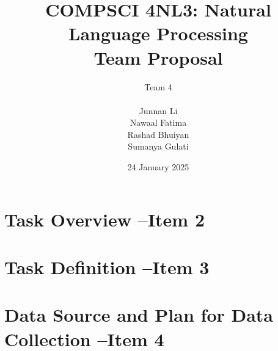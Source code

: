 \documentclass[titlepage]{article}
\title{COMPSCI 4NL3: Natural Language Processing\\Team Proposal}
\author{Team 4\\
\\ Junnan Li
\\ Nawaal Fatima
\\ Rashad Bhuiyan
\\ Sumanya Gulati}
\date{24 January 2025}
\begin{document}
\begin{titlepage}
    \maketitle
\end{titlepage}

\newpage 

\tableofcontents
\listoftables
\listoffigures

\newpage


\section{Task Overview --Item 2}

\section{Task Definition --Item 3}

\section{Data Source and Plan for Data Collection --Item 4}
\end{document}
